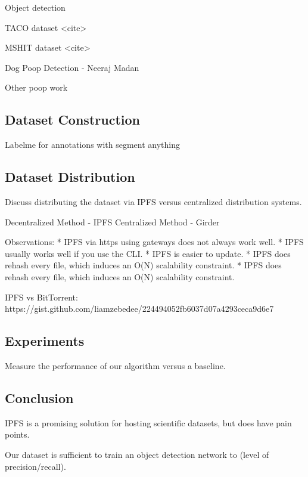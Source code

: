 \documentclass[10pt,twocolumn,letterpaper]{article}
\begin{document}
Object detection

TACO dataset <cite>

MSHIT dataset <cite>

Dog Poop Detection - Neeraj Madan

Other poop work

\subsection{Dataset Construction}

Labelme for annotations with segment anything

\subsection{Dataset Distribution}

Discuss distributing the dataset via IPFS versus centralized distribution
systems.

Decentralized Method - IPFS
Centralized Method - Girder

Observations:
* IPFS via https using gateways does not always work well.
* IPFS usually works well if you use the CLI.
* IPFS is easier to update.
* IPFS does rehash every file, which induces an O(N) scalability constraint.
* IPFS does rehash every file, which induces an O(N) scalability constraint.


IPFS vs BitTorrent:
https://gist.github.com/liamzebedee/224494052fb6037d07a4293ceca9d6e7


\subsection{Experiments}

Measure the performance of our algorithm versus a baseline.

\subsection{Conclusion}

IPFS is a promising solution for hosting scientific datasets, but does have pain points.

Our dataset is sufficient to train an object detection network to (level of
precision/recall).



{\small


}
\end{document}
